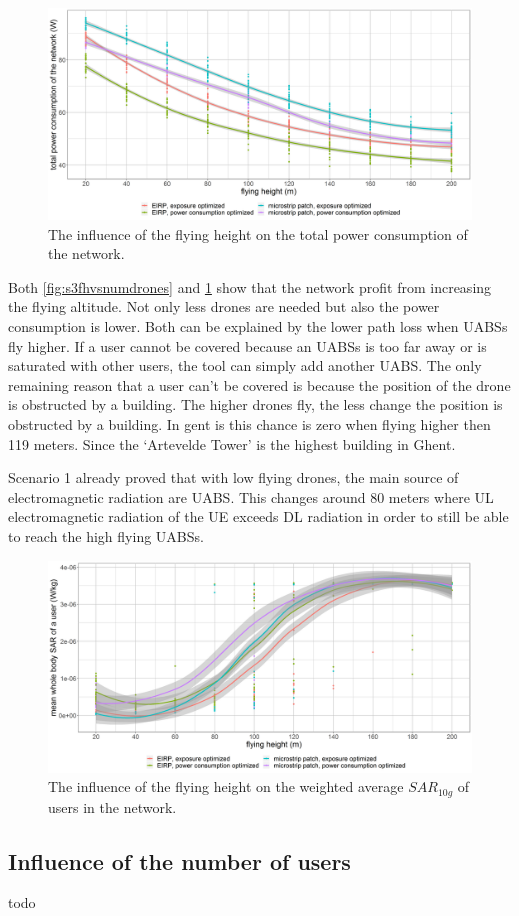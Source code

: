 \begin{figure}[h!]
  \includegraphics[width=\textwidth]{../results/s3/fhvspc.png}
  \caption{The influence of the flying height on the total power consumption of the network.}
  \label{fig:s3fhvspc}
\end{figure}

Both \ref{fig:s3fhvsnumdrones} and \ref{fig:s3fhvspc} show that the network profit from increasing the flying altitude. 
Not only less drones are needed but also the power consumption is lower. Both can be explained by the lower path loss when \gls{UABS}s fly higher.
If a user cannot be covered because an \gls{UABS}s is too far away or is saturated with other users, 
the tool can simply add another \gls{UABS}. The only remaining reason that a user can’t be covered is because the position of 
the drone is obstructed by a building. The higher drones fly, the less change the position is obstructed by a building. 
In gent is this chance is zero when flying higher then 119 meters. Since the `Artevelde Tower' is the highest building in Ghent.

Scenario 1 already proved that with low flying drones, the main source of electromagnetic radiation are \gls{UABS}. 
This changes around 80 meters where \gls{UL} electromagnetic radiation of the \gls{UE}
 exceeds \gls{DL} radiation in order to still be able to reach the high flying \gls{UABS}s.

\begin{figure}[]
  \includegraphics[width=\textwidth]{../results/s3/fhvssar.png}
  \caption{The influence of the flying height on the weighted average $SAR_{10g}$ of users in the network.}
  \label{fig:s3fhvssar}
\end{figure}

\subsection{Influence of the number of users}
todo